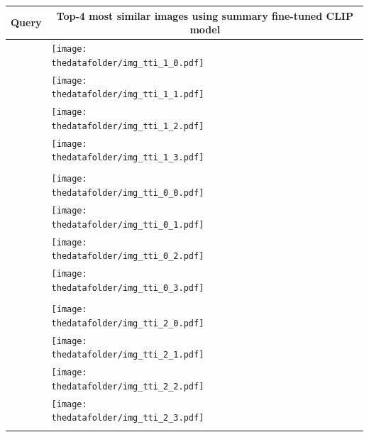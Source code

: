 \documentclass[10pt]{article} %
\begin{document}
\begin{table}[h!]
  \centering
  \begin{tabular}{m{2.7cm} p{2.9cm} p{2.9cm} p{2.9cm} p{2.9cm}}
      \toprule
      \centering \bfseries Query & \multicolumn{4}{c}{\bfseries{Top-4 most similar images using \textcolor{deepred}{summary fine-tuned CLIP model}}} \tabularnewline
      \midrule
      \texttt{} \vspace{20mm} & \centering \texttt{[image: \\thedatafolder/img\_tti\_1\_0.pdf]} \\  & \centering \texttt{[image: \\thedatafolder/img\_tti\_1\_1.pdf]} \\  & \centering \texttt{[image: \\thedatafolder/img\_tti\_1\_2.pdf]} \\  & \centering \texttt{[image: \\thedatafolder/img\_tti\_1\_3.pdf]} \\   \tabularnewline
      \midrule
       \texttt{} \vspace{20mm} & \centering \texttt{[image: \\thedatafolder/img\_tti\_0\_0.pdf]} \\  & \centering \texttt{[image: \\thedatafolder/img\_tti\_0\_1.pdf]} \\  & \centering \texttt{[image: \\thedatafolder/img\_tti\_0\_2.pdf]} \\  & \centering \texttt{[image: \\thedatafolder/img\_tti\_0\_3.pdf]} \\   \tabularnewline
      \midrule
      \texttt{} \vspace{20mm} & \centering \texttt{[image: \\thedatafolder/img\_tti\_2\_0.pdf]} \\  & \centering \texttt{[image: \\thedatafolder/img\_tti\_2\_1.pdf]} \\  & \centering \texttt{[image: \\thedatafolder/img\_tti\_2\_2.pdf]} \\  & \centering \texttt{[image: \\thedatafolder/img\_tti\_2\_3.pdf]} \\   \tabularnewline

\end{tabular}
\end{table}
\end{document}
